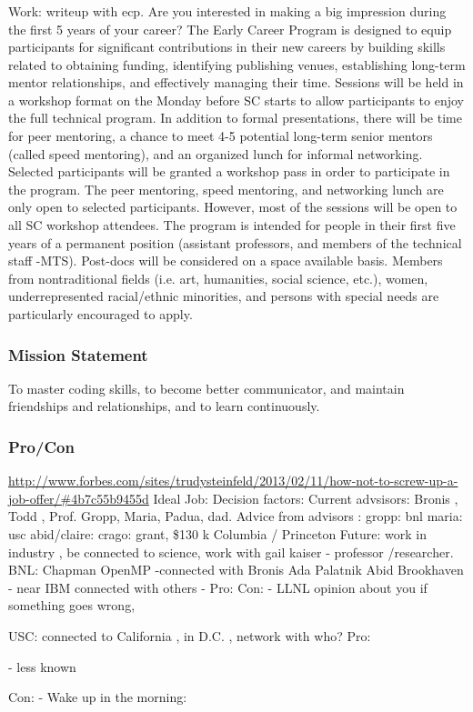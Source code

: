 \begin{frame} 


\begin{frame} 
\frametitle{} 

 Work: writeup with ecp.
Are you interested in making a big impression during the first 5 years
of your career? The Early Career Program is designed to equip
participants for significant contributions in their new careers by
building skills related to obtaining funding, identifying publishing
venues, establishing long-term mentor relationships, and effectively
managing their time. Sessions will be held in a workshop format on the
Monday before SC starts to allow participants to enjoy the full
technical program. In addition to formal presentations, there will be
time for peer mentoring, a chance to meet 4-5 potential long-term
senior mentors (called speed mentoring), and an organized lunch for
informal networking. Selected participants will be granted a workshop
pass in order to participate in the program. The peer mentoring, speed
mentoring, and networking lunch are only open to selected
participants. However, most of the sessions will be open to all SC
workshop attendees. The program is intended for people in their first
five years of a permanent position (assistant professors, and members
of the technical staff -MTS). Post-docs will be considered on a space
available basis. Members from nontraditional fields (i.e. art,
humanities, social science, etc.), women, underrepresented
racial/ethnic minorities, and persons with special needs are
particularly encouraged to apply.


\end{frame} 



\frametitle{Mission Statement} 

 To master coding skills, to become better
 communicator, and maintain friendships and relationships, and 
to learn continuously.
\end{frame} 

\begin{frame}
\frametitle{Pro/Con}
\url{http://www.forbes.com/sites/trudysteinfeld/2013/02/11/how-not-to-screw-up-a-job-offer/#4b7c55b9455d}
Ideal Job: 
Decision factors: 
Current advsisors: Bronis , Todd , Prof. Gropp,     Maria, Padua,
dad. 
Advice from advisors : gropp:  bnl   maria: usc    abid/claire:
crago: grant, \$130 k 
Columbia / Princeton 
Future: work in industry , be connected to science, work with gail
kaiser - professor /researcher.  
BNL:  
Chapman OpenMP -connected with Bronis   Ada Palatnik Abid 
Brookhaven - near IBM 
connected with others -
Pro:  
Con: 
- LLNL opinion about you if something goes wrong,

USC: 
connected to California , in D.C. , network with who?  
Pro: 

- less known  

Con: 
-   
Wake up in the morning:
\end{frame}  


